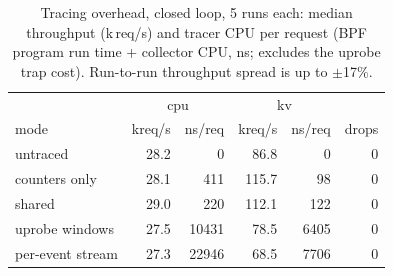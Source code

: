\begin{table}[t]\centering\caption{Tracing overhead, closed loop, 5 runs each: median throughput (k\,req/s) and tracer CPU per request (BPF program run time + collector CPU, ns; excludes the uprobe trap cost). Run-to-run throughput spread is up to $\pm$17\%.}\label{tab:overhead}\footnotesize\setlength{\tabcolsep}{2.6pt}
\begin{tabular}{lrrrrr}\toprule
 & \multicolumn{2}{c}{cpu} & \multicolumn{2}{c}{kv} & \\
mode & kreq/s & ns/req & kreq/s & ns/req & drops\\\midrule
untraced & 28.2 & 0 & 86.8 & 0 & 0 \\
counters only & 28.1 & 411 & 115.7 & 98 & 0 \\
\sys{} shared & 29.0 & 220 & 112.1 & 122 & 0 \\
uprobe windows & 27.5 & 10431 & 78.5 & 6405 & 0 \\
per-event stream & 27.3 & 22946 & 68.5 & 7706 & 0 \\
\bottomrule\end{tabular}\end{table}
